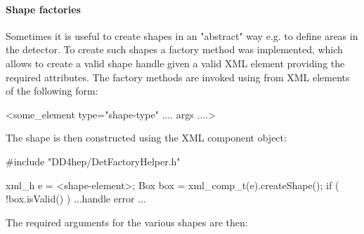 \documentclass[10pt,a4paper]{article}
\begin{document}
\paragraph{Shape factories} Sometimes it is useful to create shapes in an "abstract" way
e.g. to define areas in the detector. To create such shapes a factory method was implemented,
which allows to create a valid shape handle given a valid XML element providing the 
required attributes. The factory methods are invoked using from XML elements of the following form:
\begin{unnumberedcode}
  <some_element type="shape-type" .... args ....>
\end{unnumberedcode}
The shape is then constructed using the XML component object:
\begin{unnumberedcode}
#include "DD4hep/DetFactoryHelper.h"

  xml_h e = <shape-element>;
  Box box = xml_comp_t(e).createShape();
  if ( !box.isValid() ) { ...handle error ... }
\end{unnumberedcode}
The required arguments for the various shapes are then:
\end{document}
